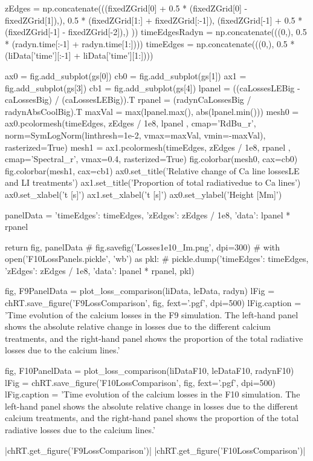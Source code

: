 \begin{pycode}[TimeDepRT]
    zEdges = np.concatenate(((fixedZGrid[0] + 0.5 * (fixedZGrid[0] - fixedZGrid[1]),),
                    0.5 * (fixedZGrid[1:] + fixedZGrid[:-1]),
                    (fixedZGrid[-1] + 0.5 * (fixedZGrid[-1] - fixedZGrid[-2]),)
                   ))
    timeEdgesRadyn = np.concatenate(((0,), 0.5 * (radyn.time[:-1] + radyn.time[1:])))
    timeEdges = np.concatenate(((0,), 0.5 * (liData['time'][:-1] + liData['time'][1:])))

    ax0 = fig.add_subplot(gs[0])
    cb0 = fig.add_subplot(gs[1])
    ax1 = fig.add_subplot(gs[3])
    cb1 = fig.add_subplot(gs[4])
    lpanel = ((caLossesLEBig - caLossesBig) / (caLossesLEBig)).T
    rpanel = (radynCaLossesBig / radynAbsCoolBig).T
    maxVal = max(lpanel.max(), abs(lpanel.min()))
    mesh0 = ax0.pcolormesh(timeEdges, zEdges / 1e8,
                           lpanel
                           , cmap='RdBu_r', norm=SymLogNorm(linthresh=1e-2, vmax=maxVal, vmin=-maxVal),
                           rasterized=True)
    mesh1 = ax1.pcolormesh(timeEdges, zEdges / 1e8,
                           rpanel
                           , cmap='Spectral_r', vmax=0.4,
                           rasterized=True)
    fig.colorbar(mesh0, cax=cb0)
    fig.colorbar(mesh1, cax=cb1)
    ax0.set_title('Relative change of Ca line losses\nwith LE and LI treatments')
    ax1.set_title('Proportion of total radiative\nlosses due to Ca lines')
    ax0.set_xlabel('t [s]')
    ax1.set_xlabel('t [s]')
    ax0.set_ylabel('Height [Mm]')

    panelData = {'timeEdges': timeEdges, 'zEdges': zEdges / 1e8, 'data': lpanel * rpanel}

    return fig, panelData
    # fig.savefig('Losses1e10_Im.png', dpi=300)
    # with open('F10LossPanels.pickle', 'wb') as pkl:
    #     pickle.dump({'timeEdges': timeEdges, 'zEdges': zEdges / 1e8, 'data': lpanel * rpanel}, pkl)

fig, F9PanelData = plot_loss_comparison(liData, leData, radyn)
lFig = chRT.save_figure('F9LossComparison', fig, fext='.pgf', dpi=500)
lFig.caption = 'Time evolution of the calcium losses in the F9 simulation. The left-hand panel shows the absolute relative change in losses due to the different calcium treatments, and the right-hand panel shows the proportion of the total radiative losses due to the calcium lines.'

fig, F10PanelData = plot_loss_comparison(liDataF10, leDataF10, radynF10)
lFig = chRT.save_figure('F10LossComparison', fig, fext='.pgf', dpi=500)
lFig.caption = 'Time evolution of the calcium losses in the F10 simulation. The left-hand panel shows the absolute relative change in losses due to the different calcium treatments, and the right-hand panel shows the proportion of the total radiative losses due to the calcium lines.'
\end{pycode}
\py[TimeDepRT]|chRT.get_figure('F9LossComparison')|
\py[TimeDepRT]|chRT.get_figure('F10LossComparison')|

